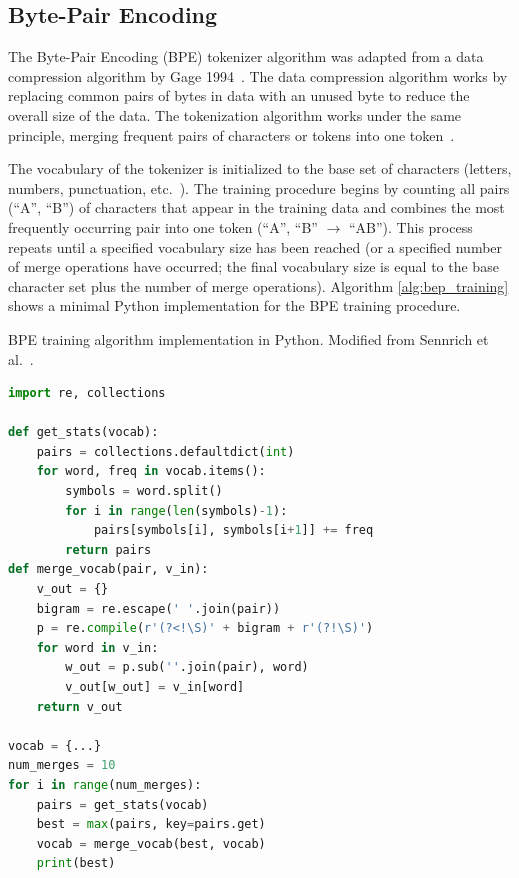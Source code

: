 \documentclass[12pt]{article}
\begin{document}
\subsection{Byte-Pair Encoding}\label{sec:bpe}
The Byte-Pair Encoding (BPE) tokenizer algorithm was adapted from a data compression algorithm by Gage 1994~\cite{gage_feb94_1994}. The data compression
algorithm works by replacing common pairs of bytes in data with an unused byte to reduce the overall size of the data. The tokenization algorithm
works under the same principle, merging frequent pairs of characters or tokens into one token~\cite{sennrich_neural_2016}.

The vocabulary of the tokenizer is initialized to the base set of characters (letters, numbers, punctuation, etc.~). The training procedure begins by
counting all pairs (``A'', ``B'') of characters that appear in the training data and combines the most frequently occurring pair into one token
(``A'', ``B'' $\rightarrow$ ``AB''). This process repeats until a specified vocabulary size has been reached (or a specified number of merge
operations have occurred; the final vocabulary size is equal to the base character set plus the number of merge operations). Algorithm
\ref{alg:bep_training} shows a minimal Python implementation for the BPE training procedure.

\begin{algorithm}[h!]
    \caption{BPE training algorithm implementation in Python. Modified from Sennrich et al.~\cite{sennrich_neural_2016}.}
    \label{alg:bep_training}
    \begin{lstlisting}[language=Python]
import re, collections

def get_stats(vocab):
    pairs = collections.defaultdict(int)
    for word, freq in vocab.items():
        symbols = word.split()
        for i in range(len(symbols)-1):
            pairs[symbols[i], symbols[i+1]] += freq
        return pairs
def merge_vocab(pair, v_in):
    v_out = {}
    bigram = re.escape(' '.join(pair))
    p = re.compile(r'(?<!\S)' + bigram + r'(?!\S)')
    for word in v_in:
        w_out = p.sub(''.join(pair), word)
        v_out[w_out] = v_in[word]
    return v_out

vocab = {...}
num_merges = 10
for i in range(num_merges):
    pairs = get_stats(vocab)
    best = max(pairs, key=pairs.get)
    vocab = merge_vocab(best, vocab)
    print(best)
    \end{lstlisting}
\end{algorithm}
\end{document}
